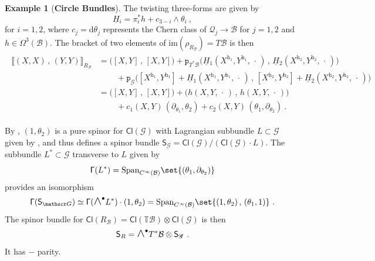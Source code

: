 \documentclass[a4paper, reqno, 11pt]{amsart}
\numberwithin{equation}{section}
\theoremstyle{definition}
\newtheorem{example}[equation]{Example}
\newcommand{\red}[1]{\underline{#1}}
\newcommand{\de}{\mathrm{d}}
\newcommand{\rmp}{\mathtt{p}}
\newcommand{\IT}{\mathbb{T}}
\renewcommand{\Im}{\ensuremath{\mathrm{im}}}
\newcommand{\Cl}{\mathsf{Cl}}
\newcommand{\cB}{{\mathcal B}}
\newcommand{\cQ}{{\mathcal Q}}
\newcommand{\ccG}{{\mathscr G}}
\newcommand{\sfS}{{\mathsf{S}}}
\newcommand{\sfGamma}{{\mathsf{\Gamma}}}
\newcommand{\sfOmega}{{\mathsf{\Omega}}}
\newcommand{\midwedge}{\text {\Large$\wedge$}}
\theoremstyle{remark}
\begin{document}
\begin{example}[\textbf{Circle Bundles}]
The twisting three-forms are given by~\cite{cavalcanti2011generalized} $$\red H{}_i = \pi_i^*h +c_{3-i} \wedge \theta_i \ , $$ for $i=1,2$, where $c_j=\de\theta_j$ represents the Chern class of $\cQ_j\to\cB$ for $j=1,2$ and $h \in \sfOmega^3(\cB)$.
The bracket of two elements of $\Im(\rho_{R_\cB})=T\cB$ is then
\begin{align}
    \begin{aligned}\label{eqn:bracketonR}
    \llbracket (X,X)\,,\,(Y,Y) \rrbracket_{R_\cB} &= \big([X,Y]\,,\,[X,Y]\big) + \rmp_{T^*\cB}\big( \red H{}_1(X^{\mathrm{h}_1}, Y^{\mathrm{h}_1},\,\cdot\,)\,,\,\red H{}_2(X^{{\mathrm{h}_2}},Y^{\mathrm{h}_2},\,\cdot\,)\big) \\
    & \qquad \, + \rmp_\ccG\big([X^{\mathrm{h}_1},Y^{\mathrm{h}_1}] + \red H{}_1(X^{\mathrm{h}_1}, Y^{\mathrm{h}_1},\,\cdot\,)\,,\, [X^{\mathrm{h}_2}, Y^{\mathrm{h}_2}]+ \red H{}_2(X^{\mathrm{h}_2},Y^{\mathrm{h}_2},\,\cdot\,)\big)\\[4pt]
    &=\big([X,Y]\,,\,[X,Y]\big) + \big(h(X,Y,\,\cdot\,)\,,\, h(X,Y,\,\cdot\,)) \\
    & \qquad \, + c_1(X, Y)\,( \partial_{\theta_1}, \theta_2) + c_2(X, Y)\,(\theta_1, \partial_{\theta_2}) \ .
\end{aligned}
\end{align}

By \cite[Section 1.2]{Alekseev:2007pure}, $(1,\theta_2)$ is a pure spinor for $\Cl(\ccG)$ with Lagrangian subbundle $L\subset \ccG$ given by \smash{$\sfGamma(L) = \text{Span}_{C^\infty(\cB)}\set{(\partial_{\theta_1}, \theta_2)}$}, and thus defines a spinor bundle $ \sfS_\ccG=\Cl(\ccG)/(\Cl(\ccG)\cdot L)$. The subbundle $L^*\subset \ccG$ transverse to $L$ given by $$\sfGamma(L^*) = \text{Span}_{C^\infty(\cB)}\set{(\theta_1, \partial_{\theta_2})}$$ provides an isomorphism $$\sfGamma(\sfS_\ccG) \simeq \sfGamma(\midwedge^\bullet L^*) \cdot (1,\theta_2) = \textrm{Span}_{C^\infty(\cB)}\set{(1,\theta_2)\,,\,(\theta_1, 1)} \ . $$ 
The spinor bundle for $\Cl(R_{\cB}) = \Cl(\IT\cB)\otimes\Cl(\ccG)$ is then
\begin{align}
    \sfS_{R} = \midwedge^\bullet T^*\cB \otimes \sfS_\ccG \ . 
\end{align}
It has $-$ parity.


\end{example}
\end{document}
